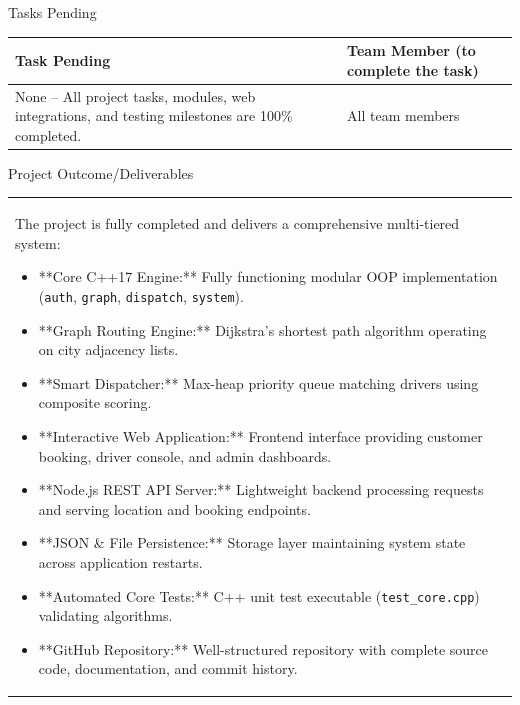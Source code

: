 \documentclass[12pt,a4paper]{article}
\newcommand{\sectiontitle}[1]{%
    {\color{GEUBlue}
    \fontsize{18}{22}\selectfont #1}
}
\newcommand{\answerbox}[2]{%
    \begin{tabularx}{\textwidth}{
        |>{\RaggedRight\arraybackslash}X|}
        \hline
        \parbox[t][#1][t]{\dimexpr\linewidth-12pt\relax}{
            \vspace{5pt}
            \fontsize{11}{13}\selectfont #2
        }\\
        \hline
    \end{tabularx}
}
\begin{document}
\vspace{0.65cm}

\sectiontitle{Tasks Pending}

\vspace{0.05cm}

\vspace{0.18cm}

\begin{tabularx}{\textwidth}{
|>{\RaggedRight\arraybackslash}X
|>{\RaggedRight\arraybackslash}p{}|
}
\hline

\textbf{Task Pending} &
\textbf{Team Member (to complete the task)} \\
\hline

None -- All project tasks, modules, web integrations, and testing milestones are 100\% completed. &
All team members \\
\hline

\end{tabularx}

\newpage

\vspace*{0.30cm}

\sectiontitle{Project Outcome/Deliverables}

\vspace{0.05cm}

\vspace{0.35cm}

\answerbox{7.7cm}{
The project is fully completed and delivers a comprehensive multi-tiered system:

\begin{itemize}
\setlength{\itemsep}{0pt}
\setlength{\topsep}{2pt}
\item **Core C++17 Engine:** Fully functioning modular OOP implementation (\texttt{auth}, \texttt{graph}, \texttt{dispatch}, \texttt{system}).
\item **Graph Routing Engine:** Dijkstra's shortest path algorithm operating on city adjacency lists.
\item **Smart Dispatcher:** Max-heap priority queue matching drivers using composite scoring.
\item **Interactive Web Application:** Frontend interface providing customer booking, driver console, and admin dashboards.
\item **Node.js REST API Server:** Lightweight backend processing requests and serving location and booking endpoints.
\item **JSON \& File Persistence:** Storage layer maintaining system state across application restarts.
\item **Automated Core Tests:** C++ unit test executable (\texttt{test\_core.cpp}) validating algorithms.
\item **GitHub Repository:** Well-structured repository with complete source code, documentation, and commit history.
\end{itemize}
}
\end{document}
